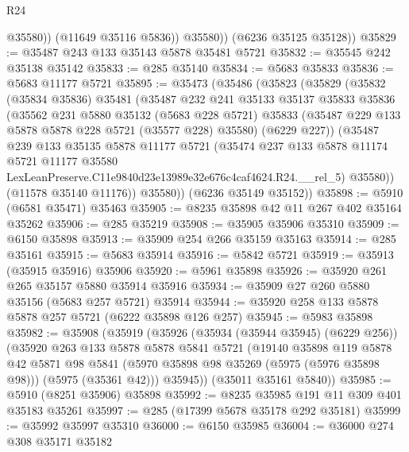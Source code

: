 \begin{lexlean}{R24}
\begin{coremodule}
                @35580))
            (@11649 @35116 @5836))
          @35580))
      (@6236 @35125 @35128))
@35829 := @35487 @243 @133 @35143 @5878 @35481 @5721
@35832 := @35545 @242 @35138 @35142
@35833 := @285 @35140
@35834 := @5683 @35833
@35836 := @5683 @11177 @5721
@35895 := @35473
    (@35486
      (@35823
        (@35829
          (@35832
            (@35834 @35836)
            @35481
            (@35487
              @232
              @241
              @35133
              @35137
              @35833
              @35836
              (@35562
                @231
                @5880
                @35132
                (@5683 @228 @5721)
                @35833
                (@35487 @229 @133 @5878 @5878 @228 @5721 (@35577 @228) @35580)
                (@6229 @227))
              (@35487
                @239
                @133
                @35135
                @5878
                @11177
                @5721
                (@35474
                  @237
                  @133
                  @5878
                  @11174
                  @5721
                  @11177
                  @35580
                  LexLeanPreserve.C11e9840d23e13989e32e676c4caf4624.R24.__rel_5)
                @35580))
            (@11578 @35140 @11176))
          @35580))
      (@6236 @35149 @35152))
@35898 := @5910 (@6581 @35471) @35463
@35905 := @8235 @35898 @42 @11 @267 @402 @35164 @35262
@35906 := @285 @35219
@35908 := @35905 @35906 @35310
@35909 := @6150 @35898
@35913 := @35909 @254 @266 @35159 @35163
@35914 := @285 @35161
@35915 := @5683 @35914
@35916 := @5842 @5721
@35919 := @35913 (@35915 @35916) @35906
@35920 := @5961 @35898
@35926 := @35920 @261 @265 @35157 @5880 @35914 @35916
@35934 := @35909 @27 @260 @5880 @35156 (@5683 @257 @5721) @35914
@35944 := @35920 @258 @133 @5878 @5878 @257 @5721 (@6222 @35898 @126 @257)
@35945 := @5983 @35898
@35982 := @35908
    (@35919
      (@35926
        (@35934 (@35944 @35945) (@6229 @256))
        (@35920
          @263
          @133
          @5878
          @5878
          @5841
          @5721
          (@19140
            @35898
            @119
            @5878
            @42
            @5871
            @98
            @5841
            (@5970 @35898 @98 @35269 (@5975 (@5976 @35898 @98)))
            (@5975 (@35361 @42)))
          @35945))
      (@35011 @35161 @5840))
@35985 := @5910 (@8251 @35906) @35898
@35992 := @8235 @35985 @191 @11 @309 @401 @35183 @35261
@35997 := @285 (@17399 @5678 @35178 @292 @35181)
@35999 := @35992 @35997 @35310
@36000 := @6150 @35985
@36004 := @36000 @274 @308 @35171 @35182

\end{coremodule}
\end{lexlean}

